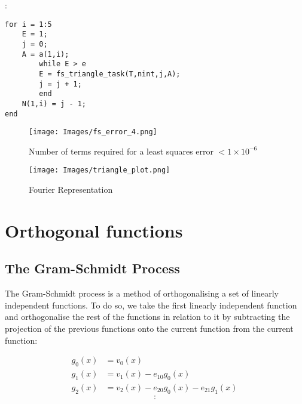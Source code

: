 \documentclass{article}
\begin{document}
:
\begin{lstlisting}
for i = 1:5
    E = 1;
    j = 0;
    A = a(1,i);
        while E > e
        E = fs_triangle_task(T,nint,j,A);   
        j = j + 1;  
        end
    N(1,i) = j - 1;
end
\end{lstlisting}


\begin{figure}[h]
\centering
	\begin{minipage}[c][][b]{0.45\linewidth}
		\begin{center}
		\texttt{[image: Images/fs\_error\_4.png]}  
		\end{center}
		\caption[b]{Number of terms required for a least squares error $ < 1 \times {10^{-6}}$}
		\label{fourierapproximationtriangle}
	\end{minipage}
\quad\quad\quad\quad
	\begin{minipage}[c][][b]{0.45\linewidth}
		\begin{center}
		\texttt{[image: Images/triangle\_plot.png]}
		\end{center}
		\caption[b]{Fourier Representation}
		\label{numberoffourierterms}
	\end{minipage}
\end{figure}

\section{Orthogonal functions}

\subsection{The Gram-Schmidt Process}

The Gram-Schmidt process is a method of orthogonalising a set of linearly independent functions. To do so, we take the first linearly independent function and orthogonalise the rest of the functions in relation to it by subtracting the projection of the previous functions onto the current function from the current function:

\begin{subequations}\label{eqn:main}
    \begin{alignat}{2}
      g_0(x) &= v_0(x) \label{subeqn:a} \\
      g_1(x) &= v_1(x) -e_{10}g_0(x) \label{subeqn:b} \\
      g_2(x) &= v_2(x) -e_{20}g_0(x) -e_{21}g_1(x) \label{subeqn:c} \
    \end{alignat}
\end{subequations}
$$
:
$$
\end{document}
